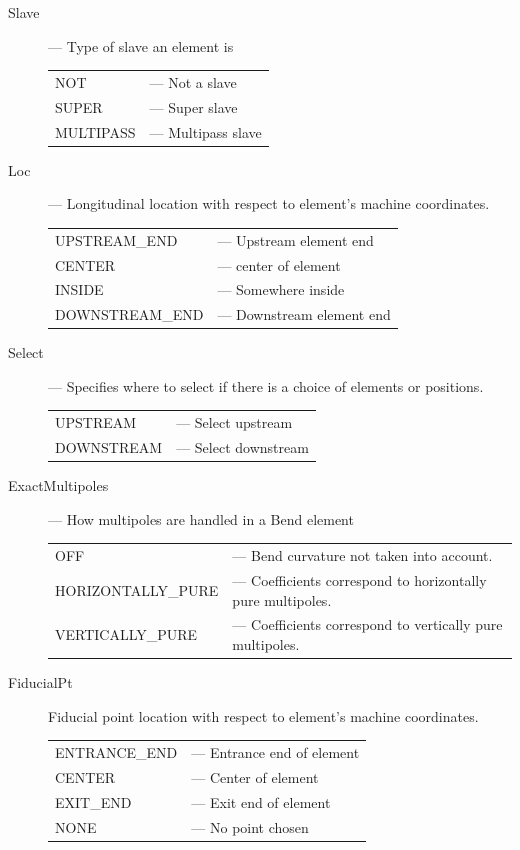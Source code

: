 \begin{description}
\begin{tabular}{ll}
\end{tabular}
%
\item[Slave] --- Type of slave an element is \Newline
\hspace*{-20pt}
\begin{tabular}{ll}
  NOT       & --- Not a slave \\
  SUPER     & --- Super slave \\
  MULTIPASS & --- Multipass slave \\
\end{tabular}
%
\item[Loc] --- Longitudinal location with respect to element's machine coordinates. \Newline
\hspace*{-20pt}
\begin{tabular}{ll}
  UPSTREAM_END   & --- Upstream element end\\
  CENTER         & --- center of element \\
  INSIDE         & --- Somewhere inside \\
  DOWNSTREAM_END & --- Downstream element end \\
\end{tabular}
%
\item[Select] --- Specifies where to select if there is a choice of elements or positions. \Newline
\hspace*{-20pt}
\begin{tabular}{ll}
  UPSTREAM   & --- Select upstream \\
  DOWNSTREAM & --- Select downstream \\
\end{tabular}
%
\item[ExactMultipoles] --- How multipoles are handled in a Bend element \Newline
\hspace*{-20pt}
\begin{tabular}{ll}
  OFF               & --- Bend curvature not taken into account. \\
  HORIZONTALLY_PURE & --- Coefficients correspond to horizontally pure multipoles. \\
  VERTICALLY_PURE   & --- Coefficients correspond to vertically pure multipoles. \\
\end{tabular}
%
\item[FiducialPt] Fiducial point location with respect to element's machine coordinates. \Newline
\hspace*{-20pt}
\begin{tabular}{ll}
  ENTRANCE_END & --- Entrance end of element \\
  CENTER       & --- Center of element \\
  EXIT_END     & --- Exit end of element \\
  NONE         & --- No point chosen \\
\end{tabular}
%
\end{description}

